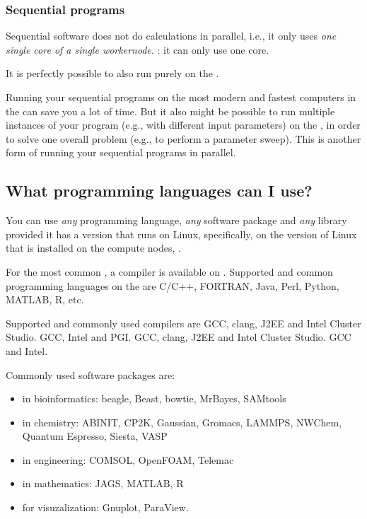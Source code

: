 \subsubsection{Sequential programs}

Sequential software does not do calculations in parallel, i.e., it only uses
\emph{one single core of a single workernode}. : it can only use one core.

It is perfectly possible to also run purely  on the
\hpc.

Running your sequential programs on the most modern and fastest computers in
the \hpc can save you a lot of time.  But it also might be possible to run
multiple instances of your program (e.g., with different input parameters) on
the \hpc, in order to solve one overall problem (e.g., to perform a parameter
sweep). This is another form of running your sequential programs in parallel.

\subsection{What programming languages can I use?}
\label{sec:what-programming-languages-can-i-use}

You can use \emph{any} programming language, \emph{any} software package and
\emph{any} library provided it has a version that runs on Linux, specifically,
on the version of Linux that is installed on the compute nodes,
\operatingsystem.

For the most common , a compiler is available on
\operatingsystem. Supported and common programming languages on the \hpc are
C/C++, FORTRAN, Java, Perl, Python, MATLAB, R, etc.

Supported and commonly used compilers are
\ifantwerpen
GCC, clang, J2EE and Intel Cluster Studio.
\fi
\ifleuven
GCC, Intel and PGI.
\fi
\ifbrussel
GCC, clang, J2EE and Intel Cluster Studio.
\fi
\ifgent
GCC and Intel.
\fi


\ifantwerpen
Commonly used software packages are:
\begin{itemize}
\item{in bioinformatics: beagle, Beast, bowtie, MrBayes, SAMtools}
\item{in chemistry: ABINIT, CP2K, Gaussian, Gromacs, LAMMPS, NWChem, Quantum Espresso, Siesta, VASP}
\item{in engineering: COMSOL, OpenFOAM, Telemac}
\item{in mathematics: JAGS, MATLAB, R}
\item{for visuzalization: Gnuplot, ParaView.}
\end{itemize}

